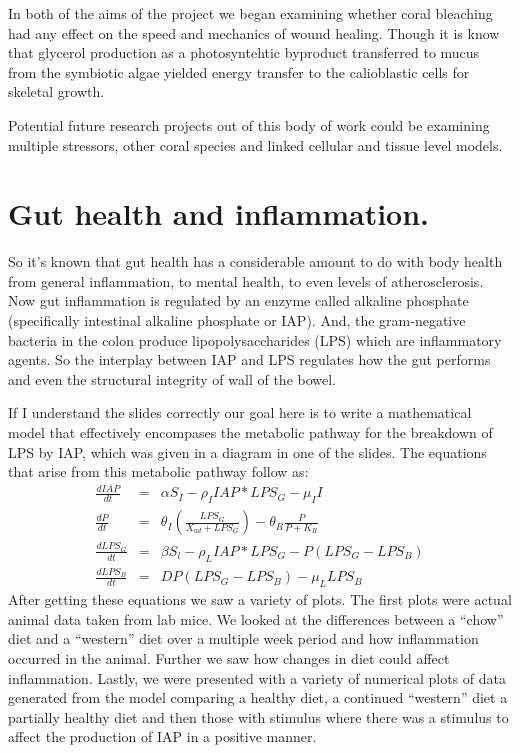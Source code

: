 \documentclass[12pt]{amsart}
\begin{document}
\begin{onehalfspace}
        In both of the aims of the project we began examining whether coral bleaching had any
        effect on the speed and mechanics of wound healing.
        Though it is know that glycerol production as a photosyntehtic byproduct transferred to
        mucus from the symbiotic algae yielded energy transfer to the calioblastic cells for
        skeletal growth.

        Potential future research projects out of this body of work could be examining
        multiple stressors, other coral species and linked cellular and tissue level models.

        \section{Gut health and inflammation.}
        So it's known that gut health has a considerable amount to do with body health from
        general inflammation, to mental health, to even levels of atherosclerosis.
        Now gut inflammation is regulated by an enzyme called alkaline phosphate (specifically
        intestinal alkaline phosphate or IAP).
        And, the gram-negative bacteria in the colon produce lipopolysaccharides (LPS) which are
        inflammatory agents.
        So the interplay between IAP and LPS regulates how the gut performs and even the structural
        integrity of wall of the bowel.

        If I understand the slides correctly our goal here is to write a mathematical model that
        effectively encompases the metabolic pathway for the breakdown of LPS by IAP, which was
        given in a diagram in one of the slides. The equations that arise from this metabolic
        pathway follow as:
        \begin{eqnarray*}
            \frac{dIAP}{dt} & = &  \alpha S_I - \rho_I IAP * LPS_G - \mu_I I\\
            \frac{dP}{dt} & = & \theta_I\left(\frac{LPS_G}{X_{ad} + LPS_G}\right) - \theta_R\frac{P}{P+K_R} \\
            \frac{dLPS_G}{dt} & = & \beta S_l - \rho_{L}IAP * LPS_G - P(LPS_G - LPS_B) \\
            \frac{dLPS_B}{dt} & = & DP(LPS_G - LPS_B) - \mu_L LPS_B
        \end{eqnarray*}
        After getting these equations we saw a variety of plots.
        The first plots were actual animal data taken from lab mice.
        We looked at the differences between a ``chow'' diet and a ``western'' diet
        over a multiple week period and how inflammation occurred in the animal.
        Further we saw how changes in diet could affect inflammation.
        Lastly, we were presented with a variety of numerical plots of data generated from the model
        comparing a healthy diet, a continued ``western'' diet a partially healthy diet and then those
        with stimulus where there was a stimulus to affect the production of IAP in a positive manner.


\end{onehalfspace}
\end{document}
